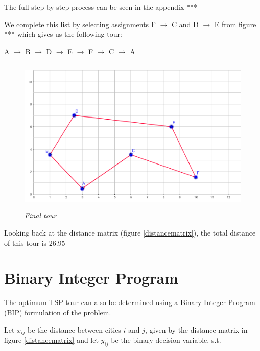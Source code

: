 \noindent
The full step-by-step process can be seen in the appendix *** %

\vspace{5mm}

\noindent
We complete this list by selecting assignments F $\rightarrow$ C and D $\rightarrow$ E from figure *** %
which gives us the following tour:

\vspace{2mm}

\begin{center}
A $\rightarrow$ B $\rightarrow$ D $\rightarrow$ E $\rightarrow$ F $\rightarrow$ C $\rightarrow$ A
\end{center}


\begin{figure}[ht] 
	\centering
	\includegraphics[height=7.5cm]{6citytour}
	\caption{\textsl{Final tour}}
	\label{6citytour}
\end{figure}

\noindent
Looking back at the distance matrix (figure \ref{distancematrix}), the total distance of this tour is 26.95




\section{Binary Integer Program}

The optimum TSP tour can also be determined using a Binary Integer Program (BIP) formulation of the problem.

\vspace{5mm}

Let $x_{ij}$ be the distance between cities $i$ and $j$, given by the distance matrix in figure \ref{distancematrix} and let $y_{ij}$ be the binary decision variable, s.t.

